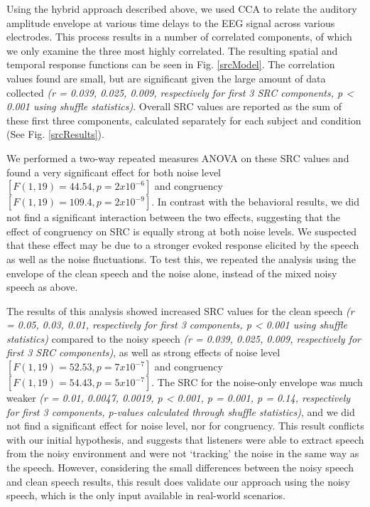 \documentclass[10pt,letterpaper]{article}
\begin{document}
  Using the hybrid approach described above, we used CCA 
  to relate the auditory amplitude envelope at various time delays to the 
  EEG signal across various electrodes. This process results in a number of 
  correlated components, of which we only examine the three most highly 
  correlated. The resulting spatial and temporal 
  response functions can be seen in Fig. \ref{srcModel}. The correlation 
  values found are small, but are significant given the large amount of 
  data collected \textit{(r = 0.039, 0.025, 0.009, respectively for 
  first 3 SRC components, p < 0.001 using shuffle statistics)}.
  Overall SRC values are reported as the sum of these first three components, 
  calculated separately for each subject and condition 
  (See Fig. \ref{srcResults}).

  We performed a two-way repeated measures ANOVA on these SRC values and found 
  a very significant effect for both noise level 
  $[F(1, 19) = 44.54, p = 2 x 10^{-6}]$ and congruency 
  $[F(1, 19) = 109.4, p = 2 x 10^{-9}]$. In contrast with the behavioral 
  results, we did not find a significant interaction between the two effects,
  suggesting that the effect of congruency on SRC is equally strong at both 
  noise levels. We suspected that these effect may be due to a stronger 
  evoked response elicited by the speech as well as the noise fluctuations. 
  To test this, we repeated the analysis using the envelope of the 
  clean speech and the noise alone, instead of the mixed noisy speech as above.

  The results of this analysis showed increased SRC values for the clean 
  speech \textit{(r = 0.05, 0.03, 0.01, respectively for first 3 components,
  p < 0.001 using shuffle statistics)} 
  compared to the noisy speech \textit{(r = 0.039, 0.025, 0.009, respectively
  for first 3 SRC components)}, as well as strong effects of noise level 
  $[F(1, 19) = 52.53, p = 7 x 10^{-7}]$ and congruency
  $[F(1, 19) = 54.43, p = 5 x 10^{-7}]$. The SRC for the noise-only envelope 
  was much weaker \textit{(r = 0.01, 0.0047, 0.0019, p < 0.001, p = 0.001, 
  p = 0.14, respectively for first 3 components, p-values calculated through
  shuffle statistics)}, and we did not find a significant effect for noise 
  level, nor for congruency. This result conflicts with our initial hypothesis,
  and suggests that listeners were able to extract speech from the noisy 
  environment and were not `tracking' the noise in the same way as the speech.
  However, considering the small differences between the noisy speech and 
  clean speech results, this result does validate our approach using the 
  noisy speech, which is the only input available in real-world scenarios.
\end{document}
